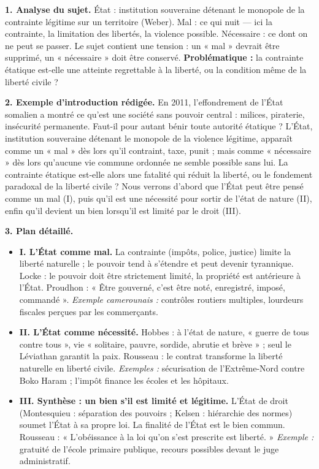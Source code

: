 \documentclass[11pt]{article}
\newcommand{\cle}[1]{{\popxbold\color{popdark}#1}}
\begin{document}
\begin{corrige}

\textbf{1. Analyse du sujet.} \cle{État} : institution souveraine détenant le monopole de la contrainte légitime sur un territoire (Weber). \cle{Mal} : ce qui nuit — ici la contrainte, la limitation des libertés, la violence possible. \cle{Nécessaire} : ce dont on ne peut se passer. Le sujet contient une tension : un « mal » devrait être supprimé, un « nécessaire » doit être conservé. \textbf{Problématique :} la contrainte étatique est-elle une atteinte regrettable à la liberté, ou la condition même de la liberté civile ?

\textbf{2. Exemple d'introduction rédigée.} En 2011, l'effondrement de l'État somalien a montré ce qu'est une société sans pouvoir central : milices, piraterie, insécurité permanente. Faut-il pour autant bénir toute autorité étatique ? L'État, institution souveraine détenant le monopole de la violence légitime, apparaît comme un « mal » dès lors qu'il contraint, taxe, punit ; mais comme « nécessaire » dès lors qu'aucune vie commune ordonnée ne semble possible sans lui. La contrainte étatique est-elle alors une fatalité qui réduit la liberté, ou le fondement paradoxal de la liberté civile ? Nous verrons d'abord que l'État peut être pensé comme un mal (I), puis qu'il est une nécessité pour sortir de l'état de nature (II), enfin qu'il devient un bien lorsqu'il est limité par le droit (III).

\textbf{3. Plan détaillé.}
\begin{itemize}
\item \textbf{I. L'État comme mal.} La contrainte (impôts, police, justice) limite la liberté naturelle ; le pouvoir tend à s'étendre et peut devenir tyrannique. Locke : le pouvoir doit être strictement limité, la propriété est antérieure à l'État. Proudhon : « Être gouverné, c'est être noté, enregistré, imposé, commandé ». \emph{Exemple camerounais :} contrôles routiers multiples, lourdeurs fiscales perçues par les commerçants.
\item \textbf{II. L'État comme nécessité.} Hobbes : à l'état de nature, « guerre de tous contre tous », vie « solitaire, pauvre, sordide, abrutie et brève » ; seul le Léviathan garantit la paix. Rousseau : le contrat transforme la liberté naturelle en liberté civile. \emph{Exemples :} sécurisation de l'Extrême-Nord contre Boko Haram ; l'impôt finance les écoles et les hôpitaux.
\item \textbf{III. Synthèse : un bien s'il est limité et légitime.} L'État de droit (Montesquieu : séparation des pouvoirs ; Kelsen : hiérarchie des normes) soumet l'État à sa propre loi. La finalité de l'État est le bien commun. Rousseau : « L'obéissance à la loi qu'on s'est prescrite est liberté. » \emph{Exemple :} gratuité de l'école primaire publique, recours possibles devant le juge administratif.
\end{itemize}


\end{corrige}
\end{document}
